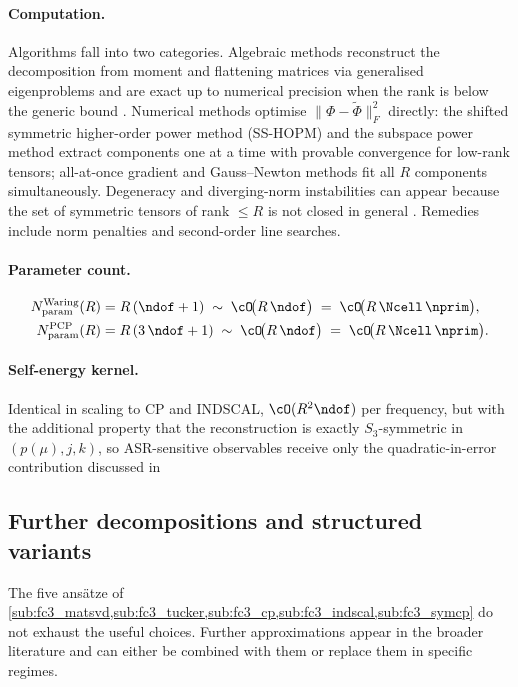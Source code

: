 \paragraph{Computation.} Algorithms fall into two categories. Algebraic methods reconstruct the
decomposition from moment and flattening matrices via generalised eigenproblems and are exact up
to numerical precision when the rank is below the generic bound
\cite{brachat_symmetric_2010, oeding_eigenvectors_2013}. Numerical methods optimise
$\|\Phi-\tilde\Phi\|_F^{2}$ directly: the shifted symmetric higher-order power method (SS-HOPM)
\cite{kolda_shifted_2011} and the subspace power method \cite{kileel_subspace_2025} extract
components one at a time with provable convergence for low-rank tensors; all-at-once gradient
and Gauss--Newton methods \cite{kolda_numerical_2015} fit all $R$ components simultaneously.
Degeneracy and diverging-norm instabilities can appear because the set of symmetric tensors of
rank $\le R$ is not closed in general
\cite{stegeman_degeneracy_2006, de_silva_tensor_2008}. Remedies include norm penalties and
second-order line searches.

\paragraph{Parameter count.}
\begin{align}
  N_{\mathrm{param}}^{\mathrm{Waring}}(R) &= R\,(\ndof + 1)
    \;\sim\; \cO\!\bigl(R\,\ndof\bigr)
    \;=\; \cO\!\bigl(R\,\Ncell\,\nprim\bigr),
    \label{eq:fc3_waring_params}\\
  N_{\mathrm{param}}^{\mathrm{PCP}}(R) &= R\,(3\,\ndof + 1)
    \;\sim\; \cO\!\bigl(R\,\ndof\bigr)
    \;=\; \cO\!\bigl(R\,\Ncell\,\nprim\bigr).
    \label{eq:fc3_pcp_params}
\end{align}

\paragraph{Self-energy kernel.} Identical in scaling to CP and INDSCAL, $\cO(R^{2}\ndof)$ per
frequency, but with the additional property that the reconstruction is exactly $S_3$-symmetric
in $(p(\mu),j,k)$, so ASR-sensitive observables receive only the quadratic-in-error contribution
discussed in 


\subsection{Further decompositions and structured variants}
\label{sub:fc3_other}
The five ans\"atze of
\cref{sub:fc3_matsvd,sub:fc3_tucker,sub:fc3_cp,sub:fc3_indscal,sub:fc3_symcp} do not exhaust the
useful choices. Further approximations appear in the broader literature and can either be
combined with them or replace them in specific regimes.


